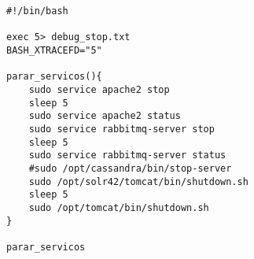\begin{lstlisting}[style=Bash]
#!/bin/bash

exec 5> debug_stop.txt
BASH_XTRACEFD="5"

parar_servicos(){
	sudo service apache2 stop
	sleep 5
	sudo service apache2 status
	sudo service rabbitmq-server stop
	sleep 5
	sudo service rabbitmq-server status
	#sudo /opt/cassandra/bin/stop-server 
	sudo /opt/solr42/tomcat/bin/shutdown.sh
	sleep 5
	sudo /opt/tomcat/bin/shutdown.sh 
}

parar_servicos
\end{lstlisting}